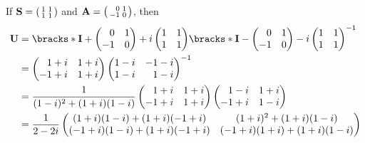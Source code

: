 \documentclass[fleqn,a4paper,11pt]{article}
\begin{document}
\begin{enumerate}[label=\textbf{\arabic*.}]
  If \(\mathbf{S} = \begin{psmallmatrix} 1 & 1 \\ 1 & 1 \end{psmallmatrix}\) and
  \(\mat A = \begin{psmallmatrix*}[r] 0 & 1 \\ -1 & 0 \end{psmallmatrix*}\),
  then
  \begin{align*}
   \mat U
   &= \bracks*{
    \mat I
    + \begin{pmatrix*}[r]
     0 & 1 \\
     -1 & 0
    \end{pmatrix*}
    + i\begin{pmatrix}
     1 & 1 \\
     1 & 1
    \end{pmatrix}
   }
   \bracks*{
    \mat I
    - \begin{pmatrix*}[r]
     0 & 1 \\
     -1 & 0
    \end{pmatrix*}
    - i\begin{pmatrix}
     1 & 1 \\
     1 & 1
    \end{pmatrix}
   }^{-1} \\
   &=
   \begin{pmatrix*}[r]
    1 + i & 1 + i \\
    -1 + i & 1 + i
   \end{pmatrix*}
   \begin{pmatrix*}[r]
    1 - i & -1 - i \\
    1 - i & 1 - i
   \end{pmatrix*}^{-1} \\
   &=
   \frac 1{(1 - i)^2 + (1 + i)(1 - i)}
   \begin{pmatrix*}[r]
    1 + i & 1 + i \\
    -1 + i & 1 + i
   \end{pmatrix*}
   \begin{pmatrix*}[r]
    1 - i & 1 + i \\
    -1 + i & 1 - i
   \end{pmatrix*} \\
   &=
   \frac 1{2 - 2i}
   \begin{pmatrix}
    (1 + i)(1 - i) + (1 + i)(-1 + i) & (1 + i)^2 + (1 + i)(1 - i) \\
    (-1 + i)(1 - i) + (1 + i)(-1 + i) & (-1 + i)(1 + i) + (1 + i)(1 - i)
   \end{pmatrix} \\

\end{align*}
\end{enumerate}
\end{document}
